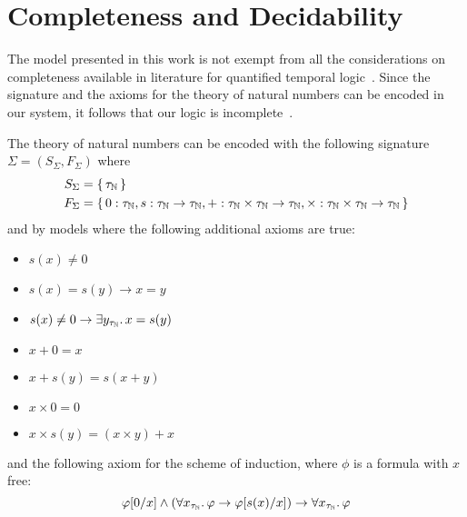 \section{Completeness and Decidability}
The model presented in this work is not exempt from all the considerations on completeness available in literature for
quantified temporal logic~\cite{merz_decidability_1992}. Since the signature and the axioms for the theory of natural
numbers can be encoded in our system, it follows that our logic is
incomplete~\cite{barwise_incompleteness_1977,tarski_undecidable_1953}.
\begin{example}
  The theory of natural numbers can be encoded with the following signature $\Sigma = (S_\Sigma, F_\Sigma)$ where
  \[
    \begin{split}
      S_\Sigma &= \set{\tau_\mathbb{N}} \\
      F_\Sigma &= \set{0 : \tau_\mathbb{N}, s : \tau_\mathbb{N} \to \tau_\mathbb{N}, + : \tau_\mathbb{N} \times
      \tau_\mathbb{N} \to \tau_\mathbb{N}, \times : \tau_\mathbb{N} \times \tau_\mathbb{N} \to \tau_\mathbb{N}}
    \end{split}
  \]
  and by models where the following additional axioms are true:
  \begin{itemize}
    \item $s(x) \neq 0$
    \item $s(x) = s(y) \to x = y$
    \item $s(x) \neq 0 \to \exists {y_{\tau_\mathbb{N}}} \ldotp {x = s(y)}$
    \item $x + 0 = x$
    \item $x + s(y) = s(x + y)$
    \item $x \times 0 = 0$
    \item $x \times s(y) = (x \times y) + x$
  \end{itemize}
  and the following axiom for the scheme of induction, where $\phi$ is a formula with $x$ free:
  \[
    \varphi[0/x] \land (\forall {x_{\tau_\mathbb{N}}} \ldotp {\varphi\to \varphi[s(x)/x]}) \to \forall {x_{\tau_\mathbb{N}}} \ldotp {\varphi}
  \]
\end{example}

